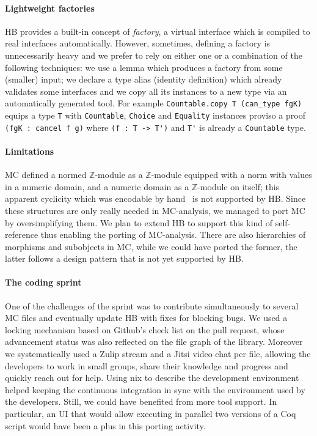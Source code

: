 \documentclass{easychair}
\def\MC{{\sf MC}}
\def\HB{{\sf HB}}
\def\newterm#1{{\it #1}}
\begin{document}
\paragraph{Lightweight factories}

\HB{} provides a built-in concept of \newterm{factory}, a virtual interface which is
compiled to real interfaces automatically. %
However, sometimes, defining a factory is
unnecessarily heavy and we prefer to rely on either one or a combination of the
following techniques: we use a lemma which produces a
factory from some (smaller) input; we declare a type alias (identity definition)
which already validates some interfaces and we copy all its instances to a new
type via an automatically generated tool. For example
\verb+Countable.copy T (can_type fgK)+ equips a type \verb+T+ with
\verb+Countable+, \verb+Choice+ and \verb+Equality+ instances proviso a
proof \verb+(fgK : cancel f g)+ where \verb+(f : T -> T')+ and \verb+T'+
is already a \verb+Countable+ type.

\paragraph{Limitations}

\MC{} defined a normed $\mathbb{Z}$-module as a
$\mathbb{Z}$-module equipped with a norm with values in a numeric domain,
and a numeric domain as a $\mathbb{Z}$-module on itself; this apparent
cyclicity which was encodable by hand~\cite{affeldt:hal-02463336}
is not supported by \HB{}.
Since these structures are only really needed in \MC{}-analysis,
we managed to port \MC{} by oversimplifying them.
We plan to extend \HB{} to support this kind of self-reference
thus enabling the porting of \MC{}-analysis. There are also hierarchies of
morphisms and subobjects in \MC{}, while we could have ported the former,
the latter follows a design pattern that is not yet
supported by \HB{}.

\paragraph{The coding sprint}

One of the challenges of the sprint was to contribute simultaneously
to several \MC{} files and eventually update \HB{} with fixes for blocking bugs.
We used a locking mechanism based on Github's check list on the pull request,
whose advancement status was also reflected on the file graph of the library.
Moreover we systematically used a Zulip stream and a Jitsi video chat per file,
allowing the developers to work in small groups,
share their knowledge and progress and quickly reach out for help. Using nix to describe the development
environment helped keeping the continuous integration in sync with the
environment used by the developers.
Still, we could have benefited from more tool support. In particular,
an UI that would allow executing in parallel two versions of a Coq script
would have been a plus in this porting activity.
\end{document}
